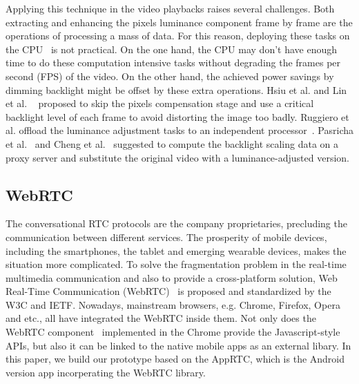 Applying this technique in the video playbacks raises several
challenges. Both extracting and enhancing the pixels luminance
component frame by frame are the operations of processing a mass of
data. For this reason, deploying these tasks on the CPU~\cite{CHP07,
  CSC02} is not practical. On the one hand, the CPU may don't have
enough time to do these computation intensive tasks without degrading
the frames per second (FPS) of the video. On the other hand, the
achieved power savings by dimming backlight might be offset by these
extra operations. Hsiu et al. and Lin et al. ~\cite{LHH14, HLH11} proposed to
skip the pixels compensation stage and use a critical backlight level
of each frame to avoid distorting the image too badly. Ruggiero et
al. offload the luminance adjustment tasks to an independent
processor~\cite{RBB08}. Pasricha et al.~\cite{PMLDV03} and Cheng et
al.~\cite{CMEDV07} suggested to compute the backlight scaling data on
a proxy server and substitute the original video with a
luminance-adjusted version.


\subsection{WebRTC}

The conversational RTC protocols are the company proprietaries,
precluding the communication between different services.  The
prosperity of mobile devices, including the smartphones, the tablet
and emerging wearable devices, makes the situation more
complicated. To solve the fragmentation problem in the real-time
multimedia communication and also to provide a cross-platform
solution, Web Real-Time Communication (WebRTC)~\cite{webrtcstandard}
is proposed and standardized by the W3C and IETF. Nowadays, mainstream
browsers, e.g. Chrome, Firefox, Opera and etc., all have integrated
the WebRTC inside them. Not only does the WebRTC
component~\cite{webrtcproject} implemented in the Chrome provide the
Javascript-style APIs, but also it can be linked to the native mobile
apps as an external libary. In this paper, we build our prototype
based on the AppRTC, which is the Android version app incorperating
the WebRTC library.
